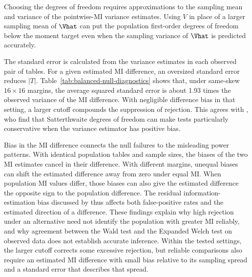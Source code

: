 Choosing the degrees of freedom requires approximations to the sampling
mean and variance of the pointwise-MI variance estimates. Using \(V\) in
place of a larger sampling mean of \(\Vhat\) can put the population first-order degrees of
freedom below the moment target even when the sampling variance of
\(\Vhat\) is predicted accurately.

The standard error is calculated from the variance estimates in each
observed pair of tables. For a given estimated MI difference, an
oversized standard error reduces \(|T|\).
Table~\ref{tab:balanced-null-diagnostics} shows that, under same-skew
\(16\times16\) margins, the average squared standard error is about
1.93 times the observed variance of the MI difference. With negligible
difference bias in that setting, a larger cutoff compounds the suppression
of rejection. This agrees with \citet{bell2002}, who find that
Satterthwaite degrees of freedom can make tests particularly conservative
when the variance estimator has positive bias.

Bias in the MI difference connects the null failures to the misleading
power patterns. With identical population tables and sample sizes, the biases of the two
MI estimates cancel in their difference. With different margins, unequal
biases can shift the estimated difference away from zero under equal MI.
When population MI values differ, those biases can also give the estimated
difference the opposite sign to the population difference. The residual information-estimation bias discussed
by \citet{paninski2003} thus affects both false-positive rates and the
estimated direction of a difference. These findings explain why high
rejection under an alternative need not identify the population with greater MI reliably,
and why agreement between the Wald test and the Expanded Welch test on observed data does
not establish accurate inference. Within the tested settings, the larger
cutoff corrects some excessive rejection, but reliable comparisons also
require an estimated MI difference with small bias relative to its
sampling spread and a standard error that describes that spread.
